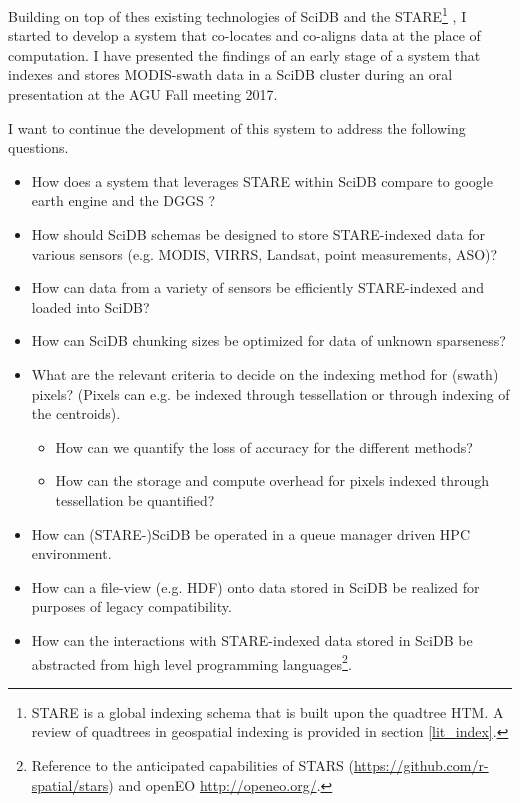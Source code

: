 \documentclass[a4paper,10pt]{article}
\begin{document}
Building on top of thes existing technologies of SciDB and the \gls{STARE}\footnote{STARE is a global indexing schema that is built upon the quadtree \gls{HTM}. A review of quadtrees in geospatial indexing is provided in section \ref{lit_index}.} \citep{Kuo2017}, 
I started to develop a system that co-locates and co-aligns data at the place of computation. I have presented the findings of an early stage of a system that indexes and stores MODIS-swath data in a SciDB cluster during an oral presentation at the AGU Fall meeting 2017.

I want to continue the development of this system to address the following questions.
\begin{itemize}
 \item How does a system that leverages \gls{STARE} within SciDB compare to google earth engine and the \gls{DGGS} \citep{OpenGeospatialConsortium2017}?
 \item How should SciDB schemas be designed to store STARE-indexed data for various sensors (e.g. MODIS, VIRRS, Landsat, point measurements, ASO)?
 \item How can data from a variety of sensors be efficiently STARE-indexed and loaded into SciDB?
 \item How can SciDB chunking sizes be optimized for data of unknown sparseness?
 \item What are the relevant criteria to decide on the indexing method for (swath) pixels? (Pixels can e.g. be indexed through tessellation or through indexing of the centroids).
 \begin{itemize}    
    \item How can we quantify the loss of accuracy for the different methods?
    \item How can the storage and compute overhead for pixels indexed through tessellation be quantified?
 \end{itemize} 
 \item How can (STARE-)SciDB be operated in a queue manager driven \gls{HPC} environment.
 \item How can a file-view (e.g. \gls{HDF}) onto data stored in SciDB be realized for purposes of legacy compatibility.
 \item How can the interactions with STARE-indexed data stored in SciDB be abstracted from high level programming languages\footnote{Reference to the 
 anticipated capabilities of STARS (\url{https://github.com/r-spatial/stars}) and openEO \url{http://openeo.org/}.}.
\end{itemize}
\end{document}
